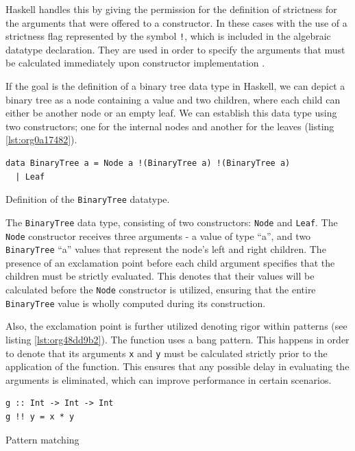 \documentclass[a4paper, titlepage, twoside]{article}
\begin{document}
Haskell handles this by giving the permission for the definition of strictness for the arguments that were offered to a constructor. In these cases with the use of a strictness flag represented by the symbol \texttt{!}, which is included in the algebraic datatype declaration. They are used in order to specify the arguments that must be calculated immediately upon constructor implementation \autocite{marlowHaskell2010Language2010,haskellwikiHaskellHaskellWiki2023}.

If the goal is the definition of a binary tree data type in Haskell, we can depict a binary tree as a node containing a value and two children, where each child can either be another node or an empty leaf. We can establish this data type using two constructors; one for the internal nodes and another for the leaves (listing \ref{lst:org0a17482}).

\begin{listing}[htbp]
\begin{verbatim}
data BinaryTree a = Node a !(BinaryTree a) !(BinaryTree a)
  | Leaf
\end{verbatim}
\caption{\label{lst:org0a17482}Definition of the \texttt{BinaryTree} datatype.}
\end{listing}

The \texttt{BinaryTree} data type, consisting of two constructors: \texttt{Node} and \texttt{Leaf}. The \texttt{Node} constructor receives three arguments - a value of type ``a'', and two \texttt{BinaryTree} ``a'' values that represent the node's left and right children. The presence of an exclamation point before each child argument specifies that the children must be strictly evaluated. This denotes that their values will be calculated before the \texttt{Node} constructor is utilized, ensuring that the entire \texttt{BinaryTree} value is wholly computed during its construction.

Also, the exclamation point is further utilized denoting rigor within patterns (see listing \ref{lst:org48dd9b2}). The function uses a bang pattern. This happens in order to denote that its arguments \texttt{x} and \texttt{y} must be calculated strictly prior to the application of the function. This ensures that any possible delay in evaluating the arguments is eliminated, which can improve performance in certain scenarios.

\begin{listing}[htbp]
\begin{verbatim}
g :: Int -> Int -> Int
g !! y = x * y
\end{verbatim}
\caption{\label{lst:org48dd9b2}Pattern matching}
\end{listing}
\end{document}
